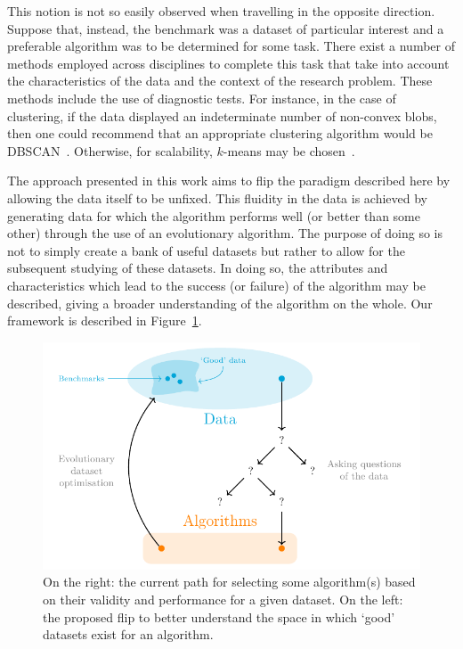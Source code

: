 \documentclass[smallextended]{svjour3}
\begin{document}
This notion is not so easily observed when travelling in the opposite direction.
Suppose that, instead, the benchmark was a dataset of particular interest and a
preferable algorithm was to be determined for some task. There exist a number of
methods employed across disciplines to complete this task that take into account
the characteristics of the data and the context of the research problem. These
methods include the use of diagnostic tests. For instance, in the case of
clustering, if the data displayed an indeterminate number of non-convex blobs,
then one could recommend that an appropriate clustering algorithm would be
DBSCAN~\cite{Ester1996}. Otherwise, for scalability, \(k\)-means may be
chosen~\cite{Wu2009}.

The approach presented in this work aims to flip the paradigm described here by
allowing the data itself to be unfixed. This fluidity in the data is achieved by
generating data for which the algorithm performs well (or better than some
other) through the use of an evolutionary algorithm. The purpose of doing so is
not to simply create a bank of useful datasets but rather to allow for the
subsequent studying of these datasets. In doing so, the attributes and
characteristics which lead to the success (or failure) of the algorithm may be
described, giving a broader understanding of the algorithm on the whole. Our
framework is described in Figure~\ref{fig:paradigm}.

\begin{figure}[htbp]
    \centering
    \includegraphics{Fig1.pdf}
    \caption{%
        On the right: the current path for selecting some algorithm(s) based on
        their validity and performance for a given dataset. On the left: the
        proposed flip to better understand the space in which `good' datasets
        exist for an algorithm.
    }\label{fig:paradigm}
\end{figure}
\end{document}
